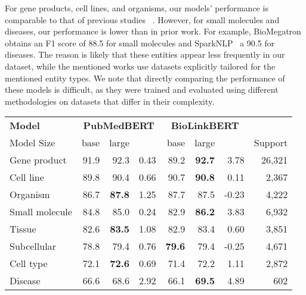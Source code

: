 \documentclass{bioinfo}
\begin{document}
For gene products, cell lines, and organisms, our models' performance is comparable to that of previous studies ~\citep{biored,Sharma2019BioFLAIRPP,jnlpba-a, jnlpba-b,kebiolm}. However, for small molecules and diseases, our performance is lower than in prior work. For example, BioMegatron~\citep{biomegatron} obtains an F1 score of 88.5 for small molecules and SparkNLP~\citep{sparknlp} a 90.5 for diseases. The reason is likely that these entities appear less frequently in our dataset, while the mentioned works use datasets explicitly tailored for the mentioned entity types. We note that directly comparing the performance of these models is difficult, as they were trained and evaluated using different methodologies on datasets that differ in their complexity.

\begin{table}[]
 {
\begin{tabular}{@{}l|rrr|rrr|r@{}}\toprule
\textbf{Model} & \multicolumn{3}{c|}{\textbf{PubMedBERT}} & \multicolumn{3}{c|}{\textbf{BioLinkBERT}} & \multicolumn{1}{c}{}        \\
Model Size     & base     & large     &      & base     & large     &      & \multicolumn{1}{r}{Support} \\\midrule
Gene product           & 91.9 & 92.3          & 0.43 & 89.2          & \textbf{92.7} & 3.78  & 26,321 \\
Cell line              & 89.8 & 90.4          & 0.66 & 90.7          & \textbf{90.8} & 0.11  & 2,367  \\
Organism               & 86.7 & \textbf{87.8} & 1.25 & 87.7          & 87.5          & -0.23 & 4,222  \\
Small molecule         & 84.8 & 85.0          & 0.24 & 82.9          & \textbf{86.2} & 3.83  & 6,932  \\
Tissue                 & 82.6 & \textbf{83.5} & 1.08 & 82.9          & 83.4          & 0.60  & 3,851  \\
Subcellular            & 78.8 & 79.4          & 0.76 & \textbf{79.6} & 79.4          & -0.25 & 4,671  \\
Cell type              & 72.1 & \textbf{72.6} & 0.69 & 71.4          & 72.2          & 1.11  & 2,872  \\
Disease                & 66.6 & 68.6          & 2.92 & 66.1          & \textbf{69.5} & 4.89  & 602     \\

\end{tabular}}
\end{table}
\end{document}
